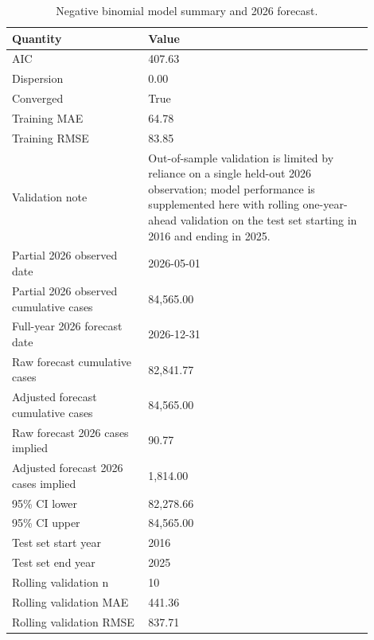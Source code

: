 \begin{table}[H]
\centering
\caption{Negative binomial model summary and 2026 forecast.}
\label{tab:negative_binomial_summary}
\small
\begin{tabular}{p{0.34\linewidth}p{0.56\linewidth}}
\toprule
Quantity & Value \\
\midrule
AIC & 407.63 \\
Dispersion & 0.00 \\
Converged & True \\
Training MAE & 64.78 \\
Training RMSE & 83.85 \\
Validation note & Out-of-sample validation is limited by reliance on a single held-out 2026 observation; model performance is supplemented here with rolling one-year-ahead validation on the test set starting in 2016 and ending in 2025. \\
Partial 2026 observed date & 2026-05-01 \\
Partial 2026 observed cumulative cases & 84,565.00 \\
Full-year 2026 forecast date & 2026-12-31 \\
Raw forecast cumulative cases & 82,841.77 \\
Adjusted forecast cumulative cases & 84,565.00 \\
Raw forecast 2026 cases implied & 90.77 \\
Adjusted forecast 2026 cases implied & 1,814.00 \\
95\% CI lower & 82,278.66 \\
95\% CI upper & 84,565.00 \\
Test set start year & 2016 \\
Test set end year & 2025 \\
Rolling validation n & 10 \\
Rolling validation MAE & 441.36 \\
Rolling validation RMSE & 837.71 \\
\bottomrule
\end{tabular}
\end{table}
